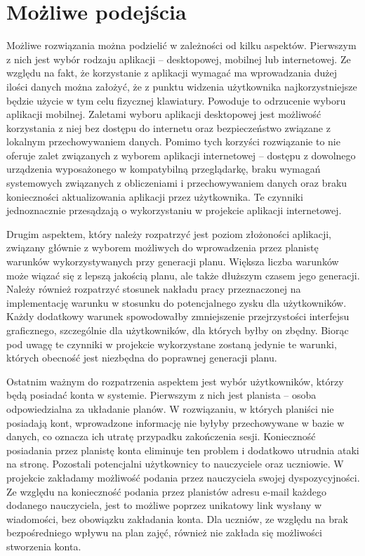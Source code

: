 \section{Możliwe podejścia}
Możliwe rozwiązania można podzielić w zależności od kilku aspektów. Pierwszym z nich jest wybór rodzaju aplikacji -- desktopowej, mobilnej lub internetowej. Ze względu na fakt, że korzystanie z aplikacji wymagać ma wprowadzania dużej ilości danych można założyć, że z punktu widzenia użytkownika najkorzystniejsze będzie użycie w tym celu fizycznej klawiatury. Powoduje to odrzucenie wyboru aplikacji mobilnej. Zaletami  wyboru aplikacji desktopowej jest możliwość korzystania z niej bez dostępu do internetu oraz bezpieczeństwo związane z lokalnym przechowywaniem danych. Pomimo tych korzyści rozwiązanie to nie oferuje zalet związanych z wyborem aplikacji internetowej -- dostępu z dowolnego urządzenia wyposażonego w kompatybilną przeglądarkę, braku wymagań systemowych związanych z obliczeniami i przechowywaniem danych oraz braku konieczności aktualizowania aplikacji przez użytkownika. Te czynniki jednoznacznie przesądzają o wykorzystaniu w projekcie aplikacji internetowej.

Drugim aspektem, który należy rozpatrzyć jest poziom złożoności aplikacji, związany głównie z wyborem możliwych do wprowadzenia przez planistę warunków wykorzystywanych przy generacji planu. Większa liczba warunków może wiązać się z lepszą jakością planu, ale także dłuższym czasem jego generacji. Należy również rozpatrzyć stosunek nakładu pracy przeznaczonej na implementację warunku w stosunku do potencjalnego zysku dla użytkowników. Każdy dodatkowy warunek spowodowałby zmniejszenie przejrzystości interfejsu graficznego, szczególnie dla użytkowników, dla których byłby on zbędny. Biorąc pod uwagę te czynniki w projekcie wykorzystane zostaną jedynie te warunki, których obecność jest niezbędna do poprawnej generacji planu.

Ostatnim ważnym do rozpatrzenia aspektem jest wybór użytkowników, którzy będą posiadać konta w systemie. Pierwszym z nich jest planista -- osoba odpowiedzialna za układanie planów. W rozwiązaniu, w których planiści nie posiadają kont, wprowadzone informację nie byłyby przechowywane w bazie w danych, co oznacza ich utratę przypadku zakończenia sesji. Konieczność posiadania przez planistę konta eliminuje ten problem i dodatkowo utrudnia ataki na stronę. Pozostali potencjalni użytkownicy to nauczyciele oraz uczniowie. W projekcie zakładamy możliwość podania przez nauczyciela swojej dyspozycyjności. Ze względu na konieczność podania przez planistów adresu e-mail każdego dodanego nauczyciela, jest to możliwe poprzez unikatowy link wysłany w wiadomości, bez obowiązku zakładania konta. Dla uczniów, ze względu na brak bezpośredniego wpływu na plan zajęć, również nie zakłada się możliwości stworzenia konta. 
